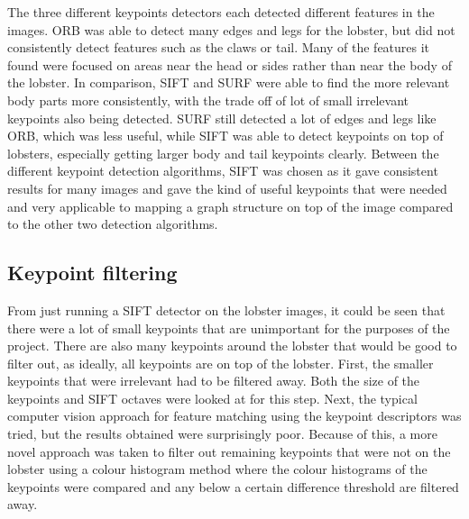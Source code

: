 The three different keypoints detectors each detected different features in the images. ORB was able to detect many edges and legs for the lobster, but did not consistently detect features such as the claws or tail. Many of the features it found were focused on areas near the head or sides rather than near the body of the lobster. In comparison, SIFT and SURF were able to find the more relevant body parts more consistently, with the trade off of lot of small irrelevant keypoints also being detected. SURF still detected a lot of edges and legs like ORB, which was less useful, while SIFT was able to detect keypoints on top of lobsters, especially getting larger body and tail keypoints clearly. Between the different keypoint detection algorithms, SIFT was chosen as it gave consistent results for many images and gave the kind of useful keypoints that were needed and very applicable to mapping a graph structure on top of the image compared to the other two detection algorithms.


\subsection{Keypoint filtering}\label{sec:kp-filtering}
From just running a SIFT detector on the lobster images, it could be seen that there were a lot of small keypoints that are unimportant for the purposes of the project. There are also many keypoints around the lobster that would be good to filter out, as ideally, all keypoints are on top of the lobster. First, the smaller keypoints that were irrelevant had to be filtered away. Both the size of the keypoints and SIFT octaves were looked at for this step. Next, the typical computer vision approach for feature matching using the keypoint descriptors \cite{sift} was tried, but the results obtained were surprisingly poor. Because of this, a more novel approach was taken to filter out remaining keypoints that were not on the lobster using a colour histogram method where the colour histograms of the keypoints were compared and any below a certain difference threshold are filtered away.

